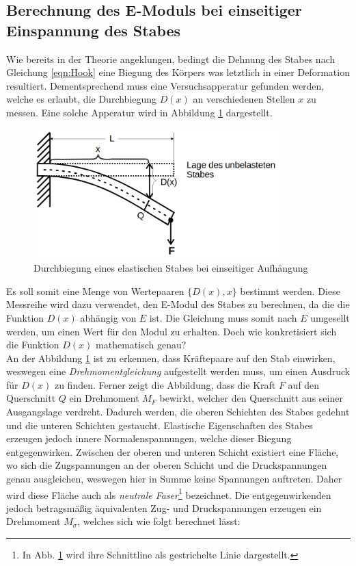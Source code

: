 \subsection{Berechnung des E-Moduls bei einseitiger Einspannung des Stabes}
\label{sec:Einseitig}

Wie bereits in der Theorie angeklungen, bedingt die Dehnung des Stabes nach Gleichung \eqref{eqn:Hook} eine Biegung des Körpers
was letztlich in einer Deformation resultiert. Dementsprechend muss eine Versuchsapperatur gefunden werden, welche es erlaubt,
die Durchbiegung $D(x)$ an verschiedenen Stellen $x$ zu messen. Eine solche Apperatur wird in Abbildung \ref{fig:Durchbiegung}
dargestellt.

\begin{figure}[H]
    \centering
    \includegraphics[height=5cm]{./content/Durchbiegung.png}
    \caption{Durchbiegung eines elastischen Stabes bei einseitiger Aufhängung}
    \label{fig:Durchbiegung}
\end{figure}

\noindent Es soll somit eine Menge von Wertepaaren $\{D(x),x\}$ bestimmt werden. Diese Messreihe wird dazu verwendet, den E-Modul
des Stabes zu berechnen, da die die Funktion $D(x)$ abhängig von $E$ ist. Die Gleichung muss somit nach $E$ umgesellt werden, um 
einen Wert für den Modul zu erhalten. Doch wie konkretisiert sich die Funktion $D(x)$ mathematisch genau?\\
An der Abbildung \ref{fig:Durchbiegung} ist zu erkennen, dass Kräftepaare auf den Stab einwirken, weswegen eine
\emph{Drehmomentgleichung} aufgestellt werden muss, um einen Ausdruck für $D(x)$ zu finden. Ferner zeigt die Abbildung, dass die Kraft $F$
auf den Querschnitt $Q$ ein Drehmoment $M_F$ bewirkt, welcher den Querschnitt aus seiner Ausgangslage verdreht. Dadurch werden,
die oberen Schichten des Stabes gedehnt und die unteren Schichten gestaucht. Elastische Eigenschaften des Stabes erzeugen jedoch
innere Normalenspannungen, welche dieser Biegung entgegenwirken. Zwischen der oberen und unteren Schicht existiert eine Fläche,
wo sich die Zugspannungen an der oberen Schicht und die Druckspannungen genau ausgleichen, weswegen hier in Summe keine Spannungen 
auftreten. Daher wird diese Fläche auch als \emph{neutrale Faser}\footnote{In Abb. \ref{fig:Durchbiegung} wird ihre Schnittline als gestrichelte Linie dargestellt.} bezeichnet.
Die entgegenwirkenden jedoch betragsmäßig äquivalenten Zug- und Druckspannungen erzeugen ein Drehmoment $M_\sigma$, welches sich wie folgt
berechnet lässt:

